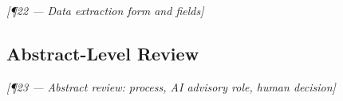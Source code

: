 
\bigskip\noindent\textit{[¶22 — Data extraction form and fields]}


\subsection{Abstract-Level Review}
\label{sec:methodology:abstract-review}



\bigskip\noindent\textit{[¶23 — Abstract review: process, AI advisory role, human decision]}

